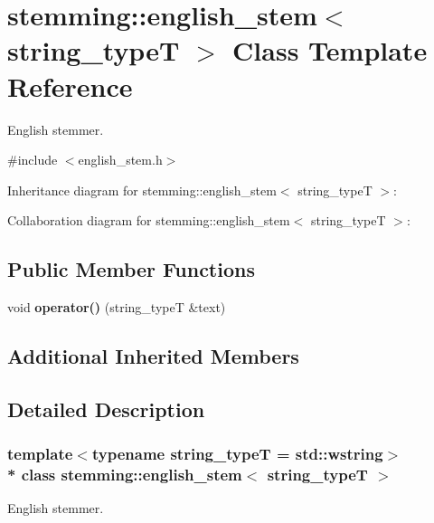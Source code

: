 \section{stemming\+:\+:english\+\_\+stem$<$ string\+\_\+typeT $>$ Class Template Reference}
\label{classstemming_1_1english__stem}


English stemmer.  




{\ttfamily \#include $<$english\+\_\+stem.\+h$>$}



Inheritance diagram for stemming\+:\+:english\+\_\+stem$<$ string\+\_\+typeT $>$\+:


Collaboration diagram for stemming\+:\+:english\+\_\+stem$<$ string\+\_\+typeT $>$\+:
\subsection*{Public Member Functions}
\begin{DoxyCompactItemize}
\item 
void {\bf operator()} (string\+\_\+typeT \&text)
\end{DoxyCompactItemize}
\subsection*{Additional Inherited Members}


\subsection{Detailed Description}
\subsubsection*{template$<$typename string\+\_\+typeT = std\+::wstring$>$\\*
class stemming\+::english\+\_\+stem$<$ string\+\_\+type\+T $>$}

English stemmer. 

